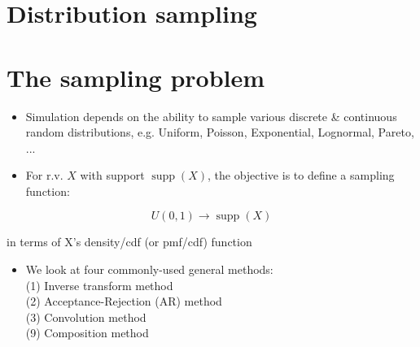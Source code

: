 \documentclass[10pt]{article}
\begin{document}
\section*{Distribution sampling}
\section*{The sampling problem}
\begin{itemize}
  \item Simulation depends on the ability to sample various discrete \& continuous random distributions, e.g. Uniform, Poisson, Exponential, Lognormal, Pareto, ...
  \item For r.v. $X$ with support $\operatorname{supp}(X)$, the objective is to define a sampling function:
\end{itemize}

$$
U(0,1) \rightarrow \operatorname{supp}(X)
$$

in terms of X's density/cdf (or pmf/cdf) function

\begin{itemize}
  \item We look at four commonly-used general methods:\\
(1) Inverse transform method\\
(2) Acceptance-Rejection (AR) method\\
(3) Convolution method\\
(9) Composition method
\end{itemize}
\end{document}
